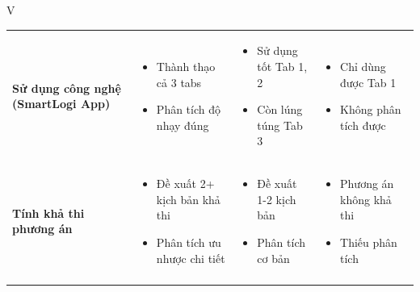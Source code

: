 \begin{competitionsection}{V}
\begin{tabularx}{\linewidth}{@{} >{\raggedright\arraybackslash}p{3.2cm} >{\raggedright\arraybackslash}X >{\raggedright\arraybackslash}X >{\raggedright\arraybackslash}X @{}}
    \textbf{Sử dụng công nghệ (SmartLogi App)} 
    & 
    \begin{itemize}[leftmargin=*,noitemsep,topsep=1ex]
        \item Thành thạo cả 3 tabs
        \item Phân tích độ nhạy đúng
    \end{itemize}
    & 
    \begin{itemize}[leftmargin=*,noitemsep,topsep=1ex]
        \item Sử dụng tốt Tab 1, 2
        \item Còn lúng túng Tab 3
    \end{itemize}
    & 
    \begin{itemize}[leftmargin=*,noitemsep,topsep=1ex]
        \item Chỉ dùng được Tab 1
        \item Không phân tích được
    \end{itemize} \\
    \addlinespace
    
    \textbf{Tính khả thi phương án} 
    & 
    \begin{itemize}[leftmargin=*,noitemsep,topsep=1ex]
        \item Đề xuất 2+ kịch bản khả thi
        \item Phân tích ưu nhược chi tiết
    \end{itemize}
    & 
    \begin{itemize}[leftmargin=*,noitemsep,topsep=1ex]
        \item Đề xuất 1-2 kịch bản
        \item Phân tích cơ bản
    \end{itemize}
    & 
    \begin{itemize}[leftmargin=*,noitemsep,topsep=1ex]
        \item Phương án không khả thi
        \item Thiếu phân tích
    \end{itemize} \\
    \addlinespace
    

\end{tabularx}
\end{competitionsection}
